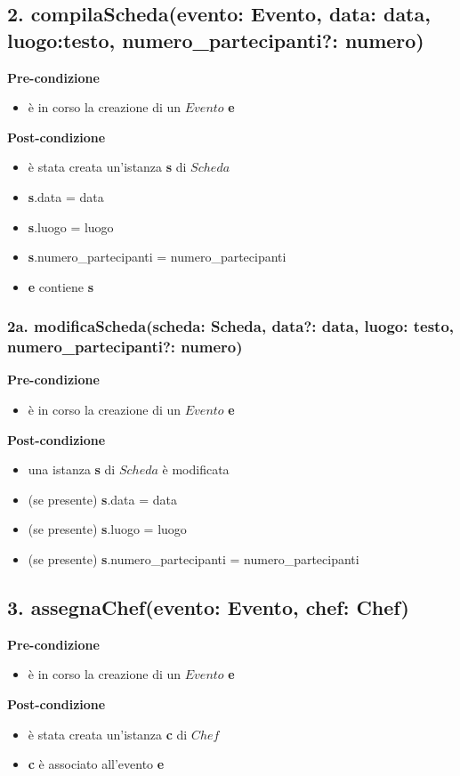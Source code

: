 \documentclass[14pt]{extarticle}
\begin{document}
\subsection*{2. compilaScheda(evento: Evento, data: data, luogo:testo, numero\_partecipanti?: numero)}

\textbf{Pre-condizione}
\begin{itemize}
  \item è in corso la creazione di un $Evento$ \textbf{e}
\end{itemize} 
\textbf{Post-condizione} 
\begin{itemize}
  \item è stata creata un'istanza \textbf{s} di $Scheda$
  \item \textbf{s}.data = data
  \item \textbf{s}.luogo = luogo
  \item \textbf{s}.numero\_partecipanti = numero\_partecipanti
  \item \textbf{e} contiene \textbf{s}
\end{itemize}

\subsubsection*{2a. modificaScheda(scheda: Scheda, data?: data, luogo: testo, numero\_partecipanti?: numero)}

\textbf{Pre-condizione}
\begin{itemize}
  \item è in corso la creazione di un $Evento$ \textbf{e}
\end{itemize} 
\textbf{Post-condizione}
\begin{itemize}
  \item una istanza \textbf{s} di $Scheda$ è modificata
  \item (se presente) \textbf{s}.data = data
  \item (se presente) \textbf{s}.luogo = luogo
  \item (se presente) \textbf{s}.numero\_partecipanti = numero\_partecipanti
\end{itemize} 


\subsection*{3. assegnaChef(evento: Evento, chef: Chef)}

\textbf{Pre-condizione}
\begin{itemize}
  \item è in corso la creazione di un $Evento$ \textbf{e}
\end{itemize}
\textbf{Post-condizione}
\begin{itemize}
  \item è stata creata un'istanza \textbf{c} di  $Chef$
  \item \textbf{c} è associato all'evento \textbf{e}
\end{itemize}
\end{document}
